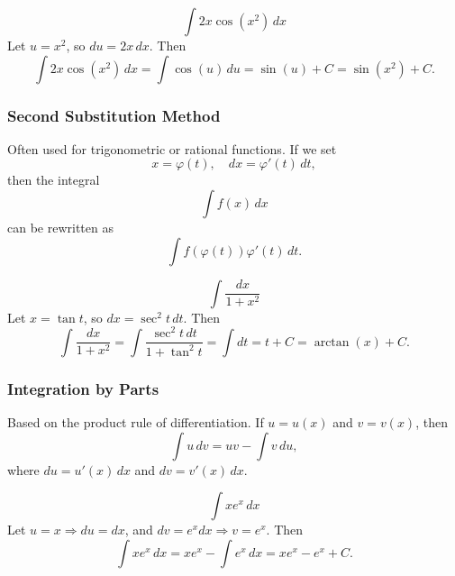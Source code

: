 \begin{example*}
    \begin{equation*}
        \int 2x \cos(x^2)\, dx
    \end{equation*}
    Let $u = x^2$, so $du = 2x\,dx$. Then
    \begin{equation*}
        \int 2x \cos(x^2)\, dx = \int \cos(u)\, du = \sin(u) + C = \sin(x^2) + C.
    \end{equation*}
\end{example*}

\subsubsection{Second Substitution Method}
Often used for trigonometric or rational functions. If we set
\begin{equation*}
    x = \varphi(t), \quad dx = \varphi'(t)\, dt,
\end{equation*}
then the integral
\begin{equation*}
    \int f(x)\, dx
\end{equation*}
can be rewritten as
\begin{equation*}
    \int f(\varphi(t)) \varphi'(t)\, dt.
\end{equation*}

\begin{example*}
    \begin{equation*}
        \int \frac{dx}{1+x^2}
    \end{equation*}
    Let $x = \tan t$, so $dx = \sec^2 t\, dt$. Then
    \begin{equation*}
        \int \frac{dx}{1+x^2} = \int \frac{\sec^2 t\, dt}{1+\tan^2 t}
        = \int dt = t + C = \arctan(x) + C.
    \end{equation*}
\end{example*}

\subsubsection{Integration by Parts}
Based on the product rule of differentiation. If $ u = u(x) $ and $ v = v(x) $, then
\begin{equation*}
    \int u \, dv = uv - \int v \, du,
\end{equation*}
where $ du = u'(x)\, dx $ and $ dv = v'(x)\, dx $.

\begin{example*}
    \begin{equation*}
        \int x e^x\, dx
    \end{equation*}
    Let $u = x \Rightarrow du = dx$, and $dv = e^x dx \Rightarrow v = e^x$. Then
    \begin{equation*}
        \int x e^x\, dx = x e^x - \int e^x\, dx = x e^x - e^x + C.
    \end{equation*}
\end{example*}


